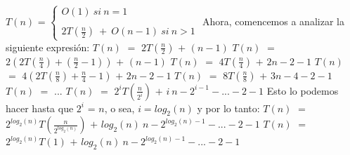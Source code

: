 \documentclass[10pt,a4paper]{article}
\begin{document}
$T(n)$ = $\left\lbrace\begin{array}{c} O(1)~si~n=1 \\ \\ 2T(\displaystyle \frac{n}{2})~+~O(n-1)~si~n>1 \end{array}\right.$
\newline
\newline
\newline
Ahora, comencemos a analizar la siguiente expresión:
\newline
\newline
$T(n)$ $=$ $2T(\displaystyle \frac{n}{2})$ $+$ $(n-1)$
\newline
\newline
\newline
$T(n)$ $=$ $2(2T(\displaystyle \frac{n}{4}) +(\displaystyle \frac{n}{2}-1))$ $+$ $(n-1)$
\newline
\newline
\newline
$T(n)$ $=$ $4T(\displaystyle \frac{n}{4})$ $+$ $2n - 2 - 1$
\newline
\newline
\newline
$T(n)$ $=$ $4(2T(\displaystyle \frac{n}{8}) + \displaystyle \frac{n}{4}-1)$ $+$ $2n - 2 - 1$
\newline
\newline
\newline
$T(n)$ $=$ $8T(\displaystyle \frac{n}{8})$ $+$ $3n - 4 - 2 - 1$
\newline
\newline
\newline
$T(n)$ $=$ ...
\newline
\newline
\newline
$T(n)$ $=$ $2^{i}T(\displaystyle \frac{n}{2^{i}})$ $+$ $i~n - 2^{i-1} - ... - 2 - 1$
\newline
\newline
\newline
Esto lo podemos hacer hasta que $2^{i}$ = $n$, o sea, $i = log_{2}(n)$ y por lo tanto:
\newline
\newline
\newline
$T(n)$ $=$ $2^{log_{2}(n)}T(\displaystyle \frac{n}{2^{log_{2}(n)}})$ $+$ $log_{2}(n)~n - 2^{log_{2}(n)-1} - ... - 2 - 1$
\newline
\newline
\newline
$T(n)$ $=$ $2^{log_{2}(n)}T(1)$ $+$ $log_{2}(n)~n - 2^{log_{2}(n)-1} - ... - 2 - 1$
\end{document}
